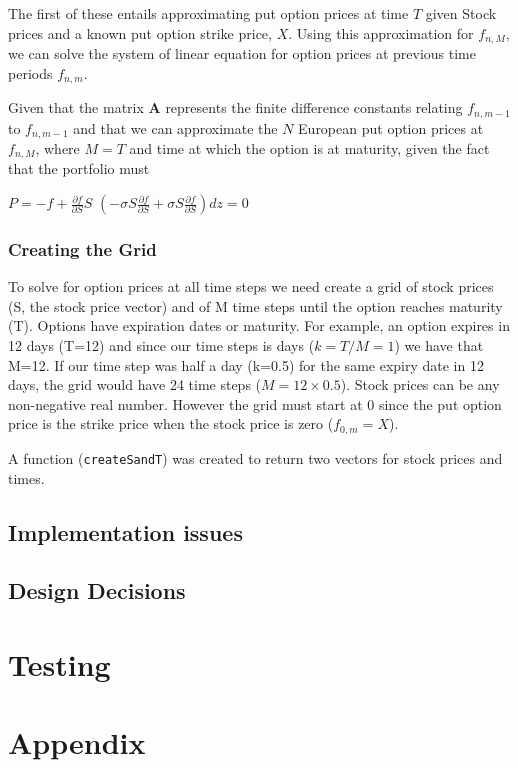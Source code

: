 \documentclass[paper=a4, fontsize=10pt]{article} %
\begin{document}
The first of these entails approximating put option prices at time $T$ given Stock prices and a known put option strike price, $X$. Using this approximation for $f_{n,M}$, we can solve the system of linear equation for option prices at previous time periods $f_{n,m}$.

Given that the matrix $\textbf{A}$ represents the finite difference constants relating $f_{n, m-1}$ to $f_{n, m-1}$ and that we can approximate the $N$ European put option prices at $f_{n,M}$, where $M=T$ and time at which the option is at maturity, given the fact that the portfolio must 

$P = -f + \frac{\partial{f}}{\partial{S}}S$
$\left( -\sigma S \frac{\partial{f}}{\partial{S}} +\sigma S \frac{\partial{f}}{\partial{S}} \right) dz = 0 $

 
\subsubsection{Creating the Grid}
To solve for option prices at all time steps we need create a grid of stock prices (S, the stock price vector) and of M time steps until the option reaches maturity (T).
Options have expiration dates or maturity. For example, an option expires in 12 days (T=12) and since our time steps is days ($k=T/M=1$) we have that M=12. If our time step was half a day (k=0.5) for the same expiry date in 12 days, the grid would have 24 time steps ($M = 12 \times 0.5$).
Stock prices can be any non-negative real number. However the grid must start at 0 since the put option price is the strike price when the stock price is zero ($f_{0,m} = X$).

A function (\texttt{createSandT}) was created to return two vectors for stock prices and times. 


\subsection{Implementation issues}
\subsection{Design Decisions}

\section{Testing}

\clearpage
\section*{Appendix}
\end{document}

